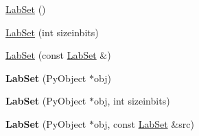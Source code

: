 \begin{DoxyCompactItemize}
\item 
\hyperlink{classelps_1_1_lab_set_aea6526eace0dcc7acdd5805b0b4534f7}{Lab\+Set} ()
\item 
\hyperlink{classelps_1_1_lab_set_a9d8405c03485b76252aa436047cf2552}{Lab\+Set} (int sizeinbits)
\item 
\hyperlink{classelps_1_1_lab_set_afe3e721e4fd857d36666fd5112200a62}{Lab\+Set} (const \hyperlink{classelps_1_1_lab_set}{Lab\+Set} \&)
\item 
\hypertarget{classelps_1_1_lab_set_ad00d44af01896c907018fd911a7f0fc0}{{\bfseries Lab\+Set} (Py\+Object $\ast$obj)}\label{classelps_1_1_lab_set_ad00d44af01896c907018fd911a7f0fc0}

\item 
\hypertarget{classelps_1_1_lab_set_af30c2ac98ef00b21674376190422374d}{{\bfseries Lab\+Set} (Py\+Object $\ast$obj, int sizeinbits)}\label{classelps_1_1_lab_set_af30c2ac98ef00b21674376190422374d}

\item 
\hypertarget{classelps_1_1_lab_set_a985838a3e9bd81ef57e033d0d8c81c55}{{\bfseries Lab\+Set} (Py\+Object $\ast$obj, const \hyperlink{classelps_1_1_lab_set}{Lab\+Set} \&src)}\label{classelps_1_1_lab_set_a985838a3e9bd81ef57e033d0d8c81c55}


\end{DoxyCompactItemize}
